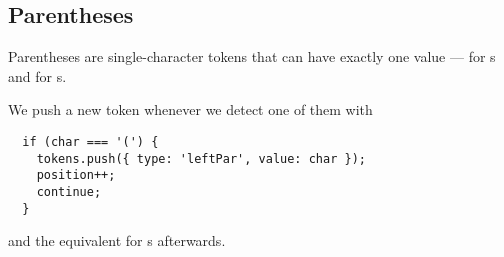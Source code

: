 \subsection{Parentheses}
Parentheses are single-character tokens that can have exactly one value ---
\code{(} for s and \code{)} for s.

We push a new token whenever we detect one of them with
\begin{verbatim}
  if (char === '(') {
    tokens.push({ type: 'leftPar', value: char });
    position++;
    continue;
  }
\end{verbatim}
and the equivalent for s afterwards.
